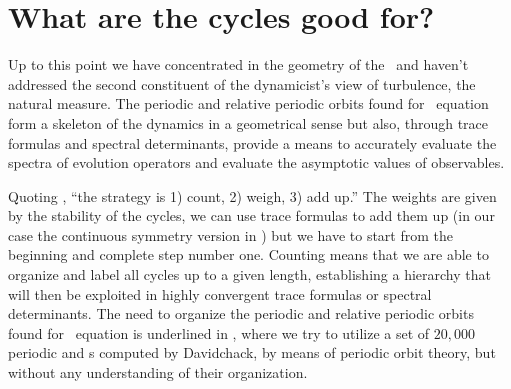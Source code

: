 



\section{What are the cycles good for?}

Up to this point we have concentrated in the geometry of the
\statesp\ and haven't addressed the second constituent of the
dynamicist's view of turbulence, the natural measure. The
periodic and relative periodic orbits found for \KS\ equation
form a skeleton of the dynamics in a geometrical sense but
also, through trace formulas and spectral
determinants, provide a means to accurately
evaluate the spectra of evolution operators and evaluate the
asymptotic values of observables.

Quoting , ``the strategy is 1) count, 2) weigh,
3) add up.'' The weights are given by the stability of the
cycles, we can use trace formulas to add them up (in our case
the continuous symmetry version in ) but we have to
start from the beginning and complete step number one. Counting
means that we are able to organize and label all cycles up to a
given length, establishing a hierarchy that will then be
exploited in highly convergent trace formulas or spectral
determinants. The need to organize the periodic and relative
periodic orbits found for \KS\ equation is underlined in
, where we try to utilize a set 
of $20,000$ periodic and {\rpo s} computed by Davidchack,
by means of periodic orbit theory, but without any understanding
of their organization.


% 

